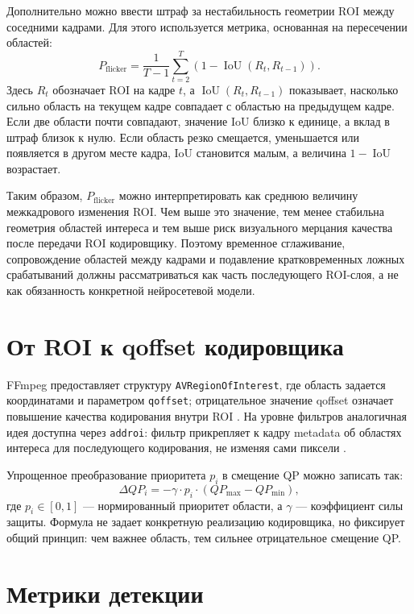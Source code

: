 \documentclass[12pt,a4paper,oneside,openany]{report}
\begin{document}
Дополнительно можно ввести штраф за нестабильность геометрии ROI между соседними
кадрами. Для этого используется метрика, основанная на пересечении областей:
\begin{equation}
P_{\mathrm{flicker}} =
\frac{1}{T-1}
\sum_{t=2}^{T}
\left(1 - \operatorname{IoU}(R_t, R_{t-1})\right).
\label{eq:flicker}
\end{equation}
Здесь $R_t$ обозначает ROI на кадре $t$, а $\operatorname{IoU}(R_t, R_{t-1})$
показывает, насколько сильно область на текущем кадре совпадает с областью на
предыдущем кадре. Если две области почти совпадают, значение IoU близко к единице,
а вклад в штраф близок к нулю. Если область резко смещается, уменьшается или
появляется в другом месте кадра, IoU становится малым, а величина
$1-\operatorname{IoU}$ возрастает.

Таким образом, $P_{\mathrm{flicker}}$ можно интерпретировать как среднюю величину
межкадрового изменения ROI. Чем выше это значение, тем менее стабильна геометрия
областей интереса и тем выше риск визуального мерцания качества после передачи ROI
кодировщику. Поэтому временное сглаживание, сопровождение областей между кадрами
и подавление кратковременных ложных срабатываний должны рассматриваться как часть
последующего ROI-слоя, а не как обязанность конкретной нейросетевой модели.
\section{От ROI к qoffset кодировщика}

FFmpeg предоставляет структуру \texttt{AVRegionOfInterest}, где область задается координатами и параметром \texttt{qoffset}; отрицательное значение qoffset означает повышение качества кодирования внутри ROI \cite{ffmpeg_roi}. На уровне фильтров аналогичная идея доступна через \texttt{addroi}: фильтр прикрепляет к кадру metadata об областях интереса для последующего кодирования, не изменяя сами пиксели \cite{ffmpeg_addroi}.

Упрощенное преобразование приоритета $p_i$ в смещение QP можно записать так:
\begin{equation}\Delta QP_i =-\gamma \cdot p_i \cdot (QP_{\max} - QP_{\min}),\label{eq:qoffset}
\end{equation}где $p_i \in [0,1]$ --- нормированный приоритет области, а $\gamma$ --- коэффициент силы защиты. Формула не задает конкретную реализацию кодировщика, но фиксирует общий принцип: чем важнее область, тем сильнее отрицательное смещение QP.

\section{Метрики детекции}
\end{document}
